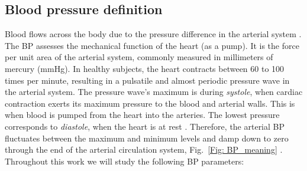 \documentclass[journal,article,moreauthors]{Definitions/mdpi}
\begin{document}
\subsection{Blood pressure definition}
Blood flows across the body due to the pressure difference in the arterial system \citep{mousavi2018designing}. The BP assesses the mechanical function of the heart (as a pump). It is the force per unit area of the arterial system, commonly measured in millimeters of mercury (mmHg). In healthy subjects, the heart contracts between 60 to 100 times per minute, resulting in a pulsatile and almost periodic pressure wave in the arterial system. The pressure wave's maximum is during \textit{systole}, when cardiac contraction exerts its maximum pressure to the blood and arterial walls. This is when blood is pumped from the heart into the arteries. The lowest pressure corresponds to \textit{diastole}, when the heart is at rest \citep{M5}. %
Therefore, the arterial BP fluctuates between the maximum and minimum levels and damp down to zero through the end of the arterial circulation system, Fig.~\ref{Fig: BP_meaning} \citep{bettsanatomy}. %
Throughout this work we will study the following BP parameters:
\end{document}

